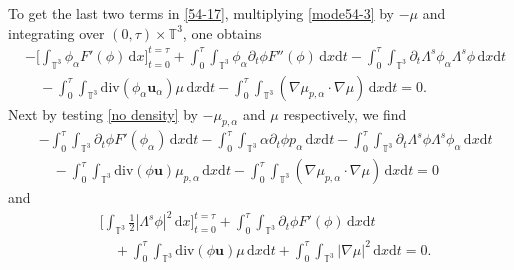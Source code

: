 \documentclass[reqno,a4paper,11pt]{amsart}
\theoremstyle{plain}
\numberwithin{equation}{section}
\renewcommand{\d}{\mathrm{d}}
\newcommand{\dx}{\d x}
\newcommand{\dt}{\d t}
\begin{document}
				To get the last two terms in \eqref{54-17}, multiplying \eqref{mode54-3} by $-\mu$ and integrating over $(0,\tau)\times\mathbb{T}^{3}$, one obtains
				\begin{align}
					\label{mode54-13}
					& -\bigg[\int_{\mathbb{T}^{3}}\phi_{\alpha}   F'(\phi)\,\dx\bigg]_{t=0}^{t=\tau}
					\nonumber +\int_0^\tau\int_{\mathbb{T}^{3}}\phi_{\alpha} \partial _{t}\phi F''(\phi)\,\dx\dt-\int_0^\tau\int_{\mathbb{T}^{3}}\partial _{t} \Lambda^{s}\phi_{\alpha} \Lambda^{s}\phi\,\dx\dt
					\\&\quad-\int_0^\tau\int_{\mathbb{T}^{3}}\mathrm{div}(\phi_{\alpha}\mathbf{u}_{\alpha}) \mu\,\dx\dt-\int_0^\tau\int_{\mathbb{T}^{3}}(\nabla\mu_{p,\alpha}\cdot \nabla \mu)\,\dx\dt=0.
				\end{align}
				Next by testing \eqref{no density} by $-\mu_{p,\alpha}$ and $\mu$ respectively, we find
				\begin{align}
					\label{mode54-131}
					& -\int_0^\tau\int_{\mathbb{T}^{3}} \partial_{t}\phi F'(\phi_{\alpha})\,\dx\dt
					\nonumber -\int_0^\tau\int_{\mathbb{T}^{3}} \alpha\partial _{t}\phi p_{\alpha}\,\dx\dt-\int_0^\tau\int_{\mathbb{T}^{3}}\partial _{t} \Lambda^{s}\phi \Lambda^{s}\phi_{\alpha}\,\dx\dt
					\\&\quad-\int_0^\tau\int_{\mathbb{T}^{3}}\mathrm{div}(\phi\mathbf{u}) \mu_{p,\alpha}\,\dx\dt-\int_0^\tau\int_{\mathbb{T}^{3}}(\nabla\mu_{p,\alpha}\cdot \nabla \mu)\,\dx\dt=0
				\end{align}
				and
				\begin{align}
					\label{mode54-14}
					& \bigg[\int_{\mathbb{T}^{3}}\frac{1}{2}|\Lambda^{s}\phi|^{2}\,\dx\bigg]_{t=0}^{t=\tau}+\int_0^\tau\int_{\mathbb{T}^{3}} \partial_{t}\phi F'(\phi)\,\dx\dt
					\nonumber
					\\&\quad+\int_0^\tau\int_{\mathbb{T}^{3}}\mathrm{div}(\phi\mathbf{u}) \mu\,\dx\dt
					+\int_0^\tau\int_{\mathbb{T}^{3}}|\nabla\mu|^2\,\dx\dt
					=0.
				\end{align}
				
\end{document}
